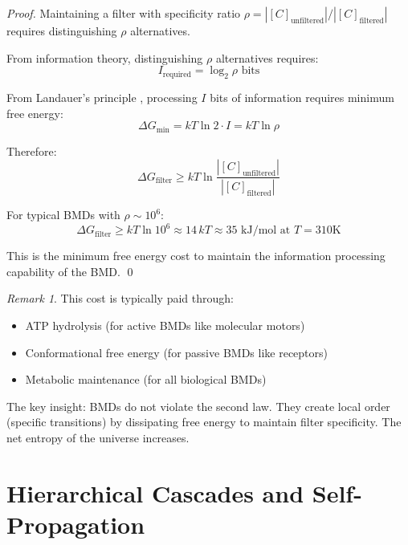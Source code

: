 \documentclass[11pt]{article}
\theoremstyle{remark}
\newtheorem{remark}[theorem]{Remark}
\begin{document}
\begin{proof}
Maintaining a filter with specificity ratio $\rho = |[C]_{\text{unfiltered}}|/|[C]_{\text{filtered}}|$ requires distinguishing $\rho$ alternatives.

From information theory, distinguishing $\rho$ alternatives requires:
\begin{equation}
I_{\text{required}} = \log_2 \rho \text{ bits}
\end{equation}

From Landauer's principle \cite{landauer1961irreversibility}, processing $I$ bits of information requires minimum free energy:
\begin{equation}
\Delta G_{\text{min}} = kT \ln 2 \cdot I = kT \ln \rho
\end{equation}

Therefore:
\begin{equation}
\Delta G_{\text{filter}} \geq kT \ln \frac{|[C]_{\text{unfiltered}}|}{|[C]_{\text{filtered}}|}
\end{equation}

For typical BMDs with $\rho \sim 10^6$:
\begin{equation}
\Delta G_{\text{filter}} \geq kT \ln 10^6 \approx 14 \, kT \approx 35 \text{ kJ/mol at } T = 310\text{K}
\end{equation}

This is the minimum free energy cost to maintain the information processing capability of the BMD. \qed
\end{proof}

\begin{remark}
This cost is typically paid through:
\begin{itemize}
\item ATP hydrolysis (for active BMDs like molecular motors)
\item Conformational free energy (for passive BMDs like receptors)
\item Metabolic maintenance (for all biological BMDs)
\end{itemize}

The key insight: BMDs do not violate the second law. They create local order (specific transitions) by dissipating free energy to maintain filter specificity. The net entropy of the universe increases.
\end{remark}

\section{Hierarchical Cascades and Self-Propagation}
\end{document}

